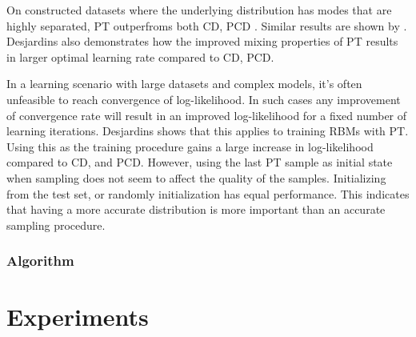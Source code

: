 \documentclass[12pt]{article}
\begin{document}
On constructed datasets where the underlying distribution has modes that are highly separated, PT outperfroms both CD, PCD \cite{desjardins2010tempered}. Similar results are shown by \cite{salakhutdinov2009tempered}. Desjardins also demonstrates how the improved mixing properties of PT results in larger optimal learning rate compared to CD, PCD.

In a learning scenario with large datasets and complex models, it's often unfeasible to reach convergence of log-likelihood. In such cases any improvement of convergence rate will result in an improved log-likelihood for a fixed number of learning iterations. Desjardins \cite{desjardins2010tempered} shows that this applies to training RBMs with PT. Using this as the training procedure gains a large increase in log-likelihood compared to CD, and PCD. However, using the last PT sample as initial state when sampling does not seem to affect the quality of the samples. Initializing from the test set, or randomly initialization has equal performance. This indicates that having a more accurate distribution is more important than an accurate sampling procedure.
\subsubsection{Algorithm}


\section{Experiments}

 

\end{document}
